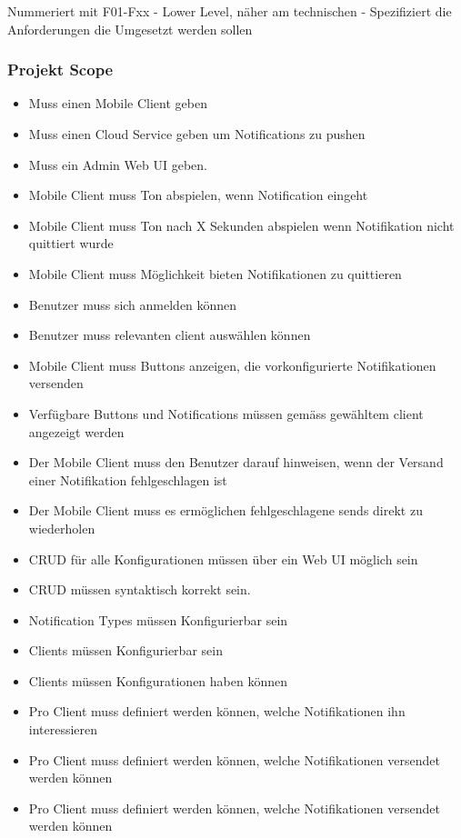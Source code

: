 Nummeriert mit F01-Fxx - Lower Level, näher am technischen - Spezifiziert die Anforderungen die Umgesetzt werden sollen

\subsubsection*{Projekt Scope}
\begin{itemize}
    \item Muss einen Mobile Client geben
    \item Muss einen Cloud Service geben um Notifications zu pushen
    \item Muss ein Admin Web UI geben.
    \item Mobile Client muss Ton abspielen, wenn Notification eingeht
    \item Mobile Client muss Ton nach X Sekunden abspielen wenn Notifikation nicht quittiert wurde
    \item Mobile Client muss Möglichkeit bieten Notifikationen zu quittieren
    \item Benutzer muss sich anmelden können
    \item Benutzer muss relevanten client auswählen können
    \item Mobile Client muss Buttons anzeigen, die vorkonfigurierte Notifikationen versenden
    \item Verfügbare Buttons und Notifications müssen gemäss gewähltem client angezeigt werden
    \item Der Mobile Client muss den Benutzer darauf hinweisen, wenn der Versand einer Notifikation fehlgeschlagen ist
    \item Der Mobile Client muss es ermöglichen fehlgeschlagene sends direkt zu wiederholen
    \item CRUD für alle Konfigurationen müssen über ein Web UI möglich sein
    \item CRUD müssen syntaktisch korrekt sein.
    \item Notification Types müssen Konfigurierbar sein
    \item Clients müssen Konfigurierbar sein
    \item Clients müssen Konfigurationen haben können
    \item Pro Client muss definiert werden können, welche Notifikationen ihn interessieren
    \item Pro Client muss definiert werden können, welche Notifikationen versendet werden können
    \item Pro Client muss definiert werden können, welche Notifikationen versendet werden können
\end{itemize}


